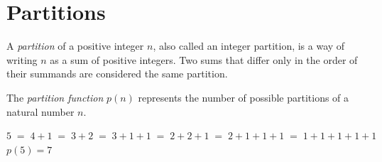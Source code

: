 %


\renewcommand{\thefootnote}{\arabic{footnote}}
\providecommand{\R}{\mathbb{R}}
\providecommand{\Q}{\mathbb{Q}}
\providecommand{\N}{\mathbb{N}}
\providecommand{\Z}{\mathbb{Z}}
\providecommand{\C}{\mathbb{C}}
\providecommand{\HH}{\mathbb{H}}

\section{Partitions}

\begin{definition}\label{def:partition}
   A \emph{partition} of a positive integer $n$, also called an integer partition, is a way of writing $n$ as a sum of positive integers. Two sums that differ only in the order of their summands are considered the same partition.

   The \emph{partition function} $p(n)$ represents the number of possible partitions of a natural number $n$.
\end{definition}

\begin{example}
$5\;=\;4+1\;=\;3+2\;=\;3+1+1\;=\;2+2+1\;=\;2+1+1+1\;=\;1+1+1+1+1$\\
$p(5)=7$
\end{example}

